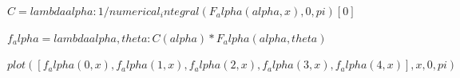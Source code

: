 \documentclass[11pt]{article}
\begin{document}
$C = lambda alpha : 1 / numerical_integral(F_alpha(alpha, x), 0, pi) [0]$


$f_alpha = lambda alpha, theta : C(alpha) * F_alpha (alpha, theta)$


$plot([f_alpha(0, x), f_alpha(1, x), f_alpha(2, x), f_alpha(3, x), f_alpha(4, x)], x, 0, pi)$

 
\end{document}
